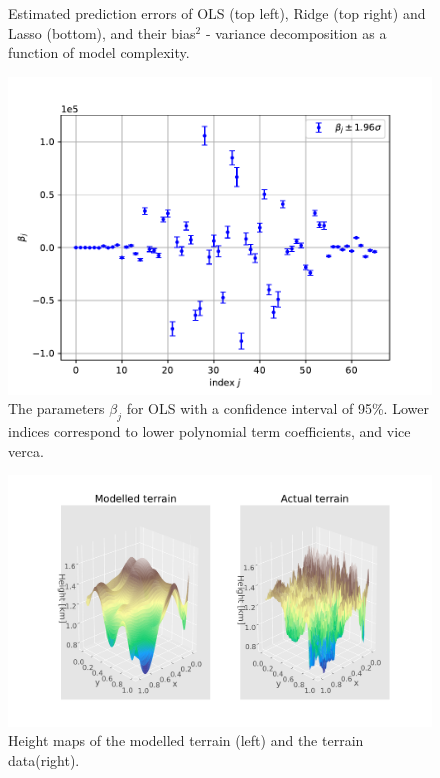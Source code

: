 \begin{figure}[!h]
    \caption{Estimated prediction errors of OLS (top left), Ridge (top right) and Lasso (bottom), and their bias$^2$ - variance decomposition as a function of model complexity.}
    \label{fig:bias_variance_all_methods}
\end{figure}

\begin{figure}[!h]
    \centering
    \includegraphics[scale=0.48]{Figures/RealDataPlots/confidence_interval_betas_028.pdf}
    \caption{The parameters $\beta_j$ for OLS with a confidence interval of 95\%. Lower indices correspond to lower polynomial term coefficients, and vice verca.}
    \label{fig:OLS_terrain_confidence_intervals}
\end{figure}


\begin{figure}[!h]
    \centering
    \includegraphics[scale=0.6]{Figures/RealDataPlots/model_vs_terrain_023.pdf}
    \caption{Height maps of the modelled terrain (left) and the terrain data(right).}
    \label{fig:model_terrain}
\end{figure}
